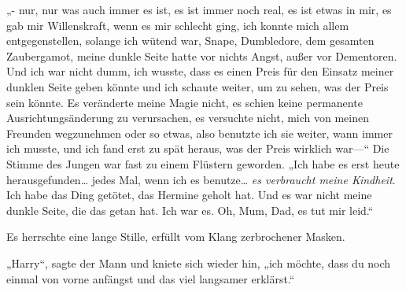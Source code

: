 „- nur, nur was auch immer es ist, es ist immer noch real, es ist etwas in mir, es gab mir Willenskraft, wenn es mir schlecht ging, ich konnte mich allem entgegenstellen, solange ich wütend war, Snape, Dumbledore, dem gesamten Zaubergamot, meine dunkle Seite hatte vor nichts Angst, außer vor Dementoren. Und ich war nicht dumm, ich wusste, dass es einen Preis für den Einsatz meiner dunklen Seite geben könnte und ich schaute weiter, um zu sehen, was der Preis sein könnte. Es veränderte meine Magie nicht, es schien keine permanente Ausrichtungsänderung zu verursachen, es versuchte nicht, mich von meinen Freunden wegzunehmen oder so etwas, also benutzte ich sie weiter, wann immer ich musste, und ich fand erst zu spät heraus, was der Preis wirklich war—“
Die Stimme des Jungen war fast zu einem Flüstern geworden.
„Ich habe es erst heute herausgefunden… jedes Mal, wenn ich es benutze… \emph{es verbraucht meine Kindheit}. Ich habe das Ding getötet, das Hermine geholt hat. Und es war nicht meine dunkle Seite, die das getan hat. Ich war es. Oh, Mum, Dad, es tut mir leid.“

Es herrschte eine lange Stille, erfüllt vom Klang zerbrochener Masken.

„Harry“, sagte der Mann und kniete sich wieder hin, „ich möchte, dass du noch einmal von vorne anfängst und das viel langsamer erklärst.“



